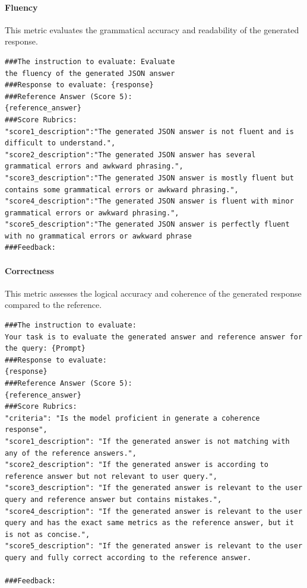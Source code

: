 \paragraph{Fluency}
This metric evaluates the grammatical accuracy and readability of the generated response.

\begin{lstlisting}[style=textstyle, frame = single, caption=Prompt structured fluency \cite{kim2024prometheus2opensource}, label=code:estructured-fluency]
###The instruction to evaluate: Evaluate 
the fluency of the generated JSON answer
###Response to evaluate: {response}
###Reference Answer (Score 5): 
{reference_answer}
###Score Rubrics:
"score1_description":"The generated JSON answer is not fluent and is difficult to understand.",
"score2_description":"The generated JSON answer has several grammatical errors and awkward phrasing.",
"score3_description":"The generated JSON answer is mostly fluent but contains some grammatical errors or awkward phrasing.",
"score4_description":"The generated JSON answer is fluent with minor grammatical errors or awkward phrasing.",
"score5_description":"The generated JSON answer is perfectly fluent with no grammatical errors or awkward phrase
###Feedback:
\end{lstlisting}

\paragraph{Correctness}
This metric assesses the logical accuracy and coherence of the generated response compared to the reference.

\begin{lstlisting}[style=textstyle, frame = single, caption=Prompt estructured correctness \cite{kim2024prometheus2opensource}, label=code:estructured-correctness]
###The instruction to evaluate:
Your task is to evaluate the generated answer and reference answer for the query: {Prompt}
###Response to evaluate:
{response}
###Reference Answer (Score 5):
{reference_answer}
###Score Rubrics:
"criteria": "Is the model proficient in generate a coherence response",
"score1_description": "If the generated answer is not matching with any of the reference answers.",
"score2_description": "If the generated answer is according to reference answer but not relevant to user query.",
"score3_description": "If the generated answer is relevant to the user query and reference answer but contains mistakes.",
"score4_description": "If the generated answer is relevant to the user query and has the exact same metrics as the reference answer, but it is not as concise.",
"score5_description": "If the generated answer is relevant to the user query and fully correct according to the reference answer.

###Feedback: 
\end{lstlisting}

